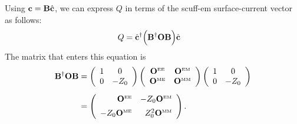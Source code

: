 \documentclass[letterpaper]{article}
\begin{document}
Using $\mathbf{c}=\mathbf{B} \hat{\mathbf{c}}$, we can express $Q$ 
in terms of the {\sc scuff-em} surface-current vector
as follows:
\begin{align*}
 Q &= \hat{\mathbf{c}}^\dagger \Big(\mathbf{B}^\dagger \mathbf{O} \mathbf{B}\Big) \hat{\mathbf{c} }
\end{align*}
The matrix that enters this equation is 
\begin{align*}
 \mathbf{B}^\dagger \mathbf{O} \mathbf{B}
&=
 \left(\begin{array}{cc}
   1 & 0 \\
   0 & -Z_0
 \end{array}\right)
 \left(\begin{array}{cc}
   \mathbf{O}^{\hbox{\tiny{EE}}} & \mathbf{O}^{\hbox{\tiny{EM}}} \\
   \mathbf{O}^{\hbox{\tiny{ME}}} & \mathbf{O}^{\hbox{\tiny{MM}}} \\
 \end{array}\right)
 \left(\begin{array}{cc}
   1 & 0 \\
   0 & -Z_0
 \end{array}\right)
\\[5pt]
&=
 \left(\begin{array}{rr}
        \mathbf{O}^{\hbox{\tiny{EE}}}      & -Z_0 \mathbf{O}^{\hbox{\tiny{EM}}} \\[5pt]
   -Z_0 \mathbf{O}^{\hbox{\tiny{ME}}} & Z_0^2 \mathbf{O}^{\hbox{\tiny{MM}}} \\
 \end{array}\right).
\end{align*}
 
\end{document}
